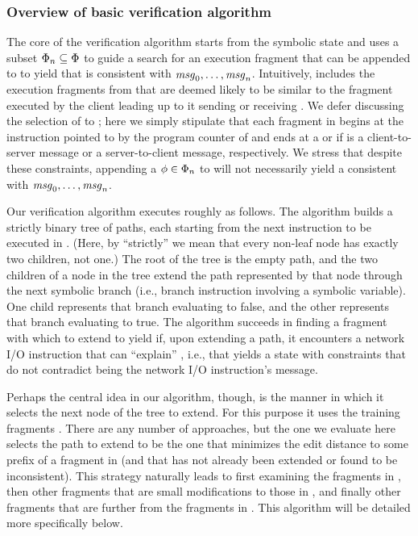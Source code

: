 \subsubsection{Overview of basic verification algorithm}
The core of the verification algorithm starts from the symbolic
state  and uses a subset $\Phi_{n}
\subseteq \Phi_{}$ to guide a search for an execution
fragment that can be appended to  to yield
\execPrefix{\msgNmbr} that is consistent with $\mathit{msg}_{0}, \ldots,
\mathit{msg}_{n}$.  Intuitively, \trainingFrags{\msgNmbr} includes the
execution fragments from \trainingFrags{} that are deemed likely to be
similar to the fragment executed by the client leading up to it
sending or receiving \msg{\msgNmbr}.  We defer discussing the selection of
\trainingFrags{\msgNmbr} to ; here we
simply stipulate that each fragment in \trainingFrags{\msgNmbr} begins
at the instruction pointed to by the program counter of
 and ends at a \sendInstr or \recvInstr if
\msg{\msgNmbr} is a client-to-server message or a server-to-client
message, respectively.  We stress that despite these constraints,
appending a $\phi \in \Phi_{n}$ to
 will not necessarily yield a
\execPrefix{\msgNmbr} consistent with $\mathit{msg}_{0},\ldots,\mathit{msg}_{n}$.

Our verification algorithm executes roughly as follows.  The algorithm
builds a strictly binary tree of paths, each starting from the next
instruction to be executed in .  (Here, by
``strictly'' we mean that every non-leaf node has exactly two
children, not one.)  The root of the tree is the empty path, and the
two children of a node in the tree extend the path represented by that
node through the next symbolic branch (i.e., branch instruction
involving a symbolic variable).  One child represents that branch
evaluating to false, and the other represents that branch evaluating
to true.  The algorithm succeeds in finding a fragment with which to
extend  to yield \execPrefix{\msgNmbr} if,
upon extending a path, it encounters a network I/O instruction that can
``explain'' \msg{\msgNmbr}, i.e., that yields a state with constraints
that do not contradict \msg{\msgNmbr} being the network I/O instruction's
message.

Perhaps the central idea in our algorithm, though, is the manner in
which it selects the next node of the tree to extend.  For this
purpose it uses the training fragments \trainingFrags{\msgNmbr}.
There are any number of approaches, but the one we evaluate here
selects the path to extend to be the one that minimizes the edit
distance to some prefix of a fragment in \trainingFrags{\msgNmbr} (and
that has not already been extended or found to be inconsistent).  This
strategy naturally leads to first examining the fragments in
\trainingFrags{\msgNmbr}, then other fragments that are small
modifications to those in \trainingFrags{\msgNmbr}, and finally other
fragments that are further from the fragments in
\trainingFrags{\msgNmbr}.  This algorithm will be detailed more
specifically below.

